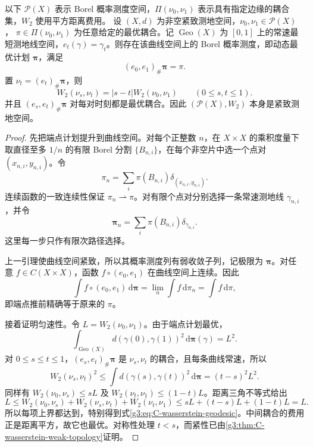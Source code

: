 \begin{theorem}\label{g3:thm:C-dynamical-optimal-plan}
	以下 \(\mathcal P(X)\) 表示 Borel 概率测度空间，\(\Pi(\nu_0,\nu_1)\) 表示具有指定边缘的耦合集，\(W_2\) 使用平方距离费用。
	设 \((X,d)\) 为非空紧致测地空间，\(\nu_0,\nu_1\in\mathcal P(X)\)，
	\(\pi\in\Pi(\nu_0,\nu_1)\) 为任意给定的最优耦合。记 \(\operatorname{Geo}(X)\) 为 \([0,1]\) 上的常速最短测地线空间，\(e_t(\gamma)=\gamma_t\)。则存在该曲线空间上的 Borel 概率测度，即动态最优计划
	\(\boldsymbol\pi\)，满足
	\[
		(e_0,e_1)_\#\boldsymbol\pi=\pi.
	\]
	置 \(\nu_t=(e_t)_\#\boldsymbol\pi\)，则
	\begin{equation}\label{g3:eq:C-wasserstein-geodesic}
		W_2(\nu_s,\nu_t)=|s-t|W_2(\nu_0,\nu_1)
		\qquad(0\le s,t\le1).
	\end{equation}
	并且 \((e_s,e_t)_\#\boldsymbol\pi\) 对每对时刻都是最优耦合。因此 \((\mathcal P(X),W_2)\) 本身是紧致测地空间。
\end{theorem}
\begin{proof}
	先把端点计划提升到曲线空间。对每个正整数 \(n\)，在 \(X\times X\) 的乘积度量下取直径至多 \(1/n\) 的有限 Borel 分割 \(\{B_{n,i}\}\)，在每个非空片中选一个点对 \((x_{n,i},y_{n,i})\)。令
	\[
		\pi_n=\sum_i\pi(B_{n,i})\delta_{(x_{n,i},y_{n,i})}.
	\]
	连续函数的一致连续性保证 \(\pi_n\rightharpoonup\pi\)。对有限个点对分别选择一条常速测地线 \(\gamma_{n,i}\)，并令
	\[
		\boldsymbol\pi_n=\sum_i\pi(B_{n,i})\delta_{\gamma_{n,i}}.
	\]
	这里每一步只作有限次路径选择。

	上一引理使曲线空间紧致，所以其概率测度列有弱收敛子列，记极限为 \(\boldsymbol\pi\)。对任意 \(f\in C(X\times X)\)，函数
	\(f\circ(e_0,e_1)\) 在曲线空间上连续。因此
	\[
		\int f\circ(e_0,e_1)\,\mathrm d\boldsymbol\pi
		=\lim_n\int f\,\mathrm d\pi_n=\int f\,\mathrm d\pi,
	\]
	即端点推前精确等于原来的 \(\pi\)。

	接着证明匀速性。令 \(L=W_2(\nu_0,\nu_1)\)。由于端点计划最优，
	\[
		\int_{\operatorname{Geo}(X)}
		     d(\gamma(0),\gamma(1))^2\,\mathrm d\boldsymbol\pi(\gamma)
		=L^2.
	\]
	对 \(0\le s\le t\le1\)，\((e_s,e_t)_\#\boldsymbol\pi\) 是 \(\nu_s,\nu_t\) 的耦合，且每条曲线常速，所以
	\[
		W_2(\nu_s,\nu_t)^2
		\le\int d(\gamma(s),\gamma(t))^2\,\mathrm d\boldsymbol\pi
		=(t-s)^2L^2.
	\]
	同样有 \(W_2(\nu_0,\nu_s)\le sL\) 及
	\(W_2(\nu_t,\nu_1)\le(1-t)L\)。距离三角不等式给出
	\[
		L\le W_2(\nu_0,\nu_s)+W_2(\nu_s,\nu_t)+W_2(\nu_t,\nu_1)
		\le sL+(t-s)L+(1-t)L=L.
	\]
	所以每项上界都达到，特别得到式\eqref{g3:eq:C-wasserstein-geodesic}。中间耦合的费用正是距离平方，故它也最优。对称性处理 \(t<s\)，而紧性已由\cref{g3:thm:C-wasserstein-weak-topology}证明。
\end{proof}

